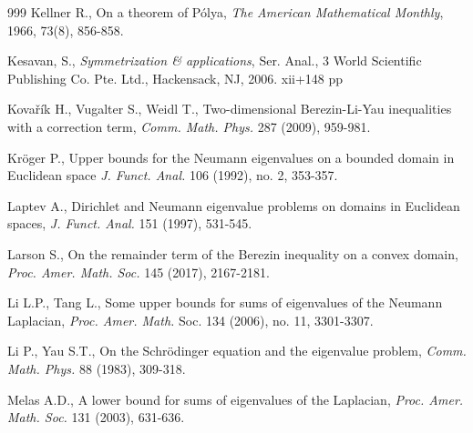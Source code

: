 \documentclass[11pt,twoside, leqno]{article}
\numberwithin{equation}{section}
\begin{document}
\begin{thebibliography}{999}
 \vspace{-0.3cm}
Kellner R., On a theorem of P\'olya, {\em The American Mathematical Monthly}, 1966,
73(8), 856-858.

 \vspace{-0.3cm}
Kesavan, S.,
{\em Symmetrization \& applications},
Ser. Anal., 3 World Scientific Publishing Co. Pte. Ltd., Hackensack, NJ, 2006. xii+148 pp

%


 \vspace{-0.3cm}
Kova\v{r}\'ik H., Vugalter S., Weidl T., Two-dimensional Berezin-Li-Yau inequalities with a correction term,
{\em Comm. Math. Phys.} 287 (2009), 959-981.


 \vspace{-0.3cm}
Kr\"oger P., Upper bounds for the Neumann eigenvalues on a bounded domain in Euclidean space
{\em J. Funct. Anal.} 106 (1992), no. 2, 353-357.



 \vspace{-0.3cm}
  Laptev A.,
Dirichlet and Neumann eigenvalue problems on domains in Euclidean spaces,
{\em J. Funct. Anal.} 151 (1997), 531-545.


\vspace{-0.3cm}
Larson S., On the remainder term of the Berezin inequality on a convex domain,  {\em Proc. Amer. Math. Soc.} 145 (2017), 2167-2181.


\vspace{-0.3cm}
 Li L.P., Tang L.,
Some upper bounds for sums of eigenvalues of the Neumann Laplacian,
{\em Proc. Amer. Math.} Soc. 134 (2006), no. 11, 3301-3307.


\vspace{-0.3cm}
 Li P., Yau S.T., On the Schr\"odinger equation and the eigenvalue problem, {\em Comm. Math. Phys.} 88 (1983), 309-318.


\vspace{-0.3cm}
Melas A.D., A lower bound for sums of eigenvalues of the Laplacian, {\em Proc. Amer. Math. Soc.} 131 (2003),  631-636.


\end{thebibliography}
\end{document}
